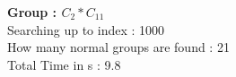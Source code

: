 \textbf{Group : $C_2*C_{11}$}\\
Searching up to index : 1000\\
How many normal groups are found : 21\\
Total Time in s : 9.8\\
